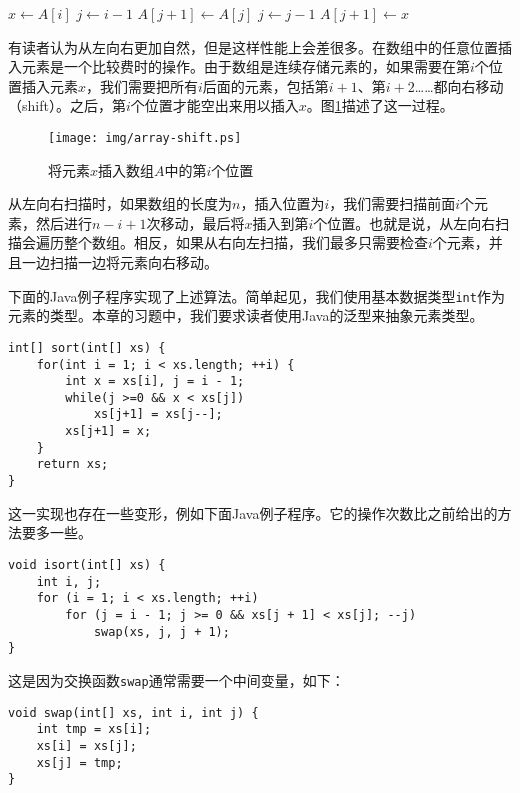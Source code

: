 \documentclass[UTF8]{article}
\begin{document}
\begin{algorithmic}[1]
    \State $x \gets A[i]$
    \State $j \gets i-1$
      \State $A[j+1] \gets A[j]$
      \State $j \gets j - 1$
    \EndWhile
    \State $A[j+1] \gets x$
  \EndFor
\EndFunction
\end{algorithmic}

有读者认为从左向右更加自然，但是这样性能上会差很多。在数组中的任意位置插入元素是一个比较费时的操作。由于数组是连续存储元素的，如果需要在第$i$个位置插入元素$x$，我们需要把所有$i$后面的元素，包括第$i+1$、第$i+2$……都向右移动（shift）。之后，第$i$个位置才能空出来用以插入$x$。图\ref{fig:array-shift}描述了这一过程。

\begin{figure}[htbp]
  \centering
  \texttt{[image: img/array-shift.ps]}
  \caption{将元素$x$插入数组$A$中的第$i$个位置}
  \label{fig:array-shift}
\end{figure}

从左向右扫描时，如果数组的长度为$n$，插入位置为$i$，我们需要扫描前面$i$个元素，然后进行$n-i+1$次移动，最后将$x$插入到第$i$个位置。也就是说，从左向右扫描会遍历整个数组。相反，如果从右向左扫描，我们最多只需要检查$i$个元素，并且一边扫描一边将元素向右移动。

下面的Java例子程序实现了上述算法。简单起见，我们使用基本数据类型\texttt{int}作为元素的类型。本章的习题中，我们要求读者使用Java的泛型来抽象元素类型。

\lstset{language=Java}
\begin{lstlisting}
int[] sort(int[] xs) {
    for(int i = 1; i < xs.length; ++i) {
        int x = xs[i], j = i - 1;
        while(j >=0 && x < xs[j])
            xs[j+1] = xs[j--];
        xs[j+1] = x;
    }
    return xs;
}
\end{lstlisting}

这一实现也存在一些变形，例如下面Java例子程序。它的操作次数比之前给出的方法要多一些。

\lstset{language=Java}
\begin{lstlisting}
void isort(int[] xs) {
    int i, j;
    for (i = 1; i < xs.length; ++i)
        for (j = i - 1; j >= 0 && xs[j + 1] < xs[j]; --j)
            swap(xs, j, j + 1);
}
\end{lstlisting}

这是因为交换函数\texttt{swap}通常需要一个中间变量，如下：

\begin{lstlisting}
void swap(int[] xs, int i, int j) {
    int tmp = xs[i];
    xs[i] = xs[j];
    xs[j] = tmp;
}
\end{lstlisting}
\end{document}
